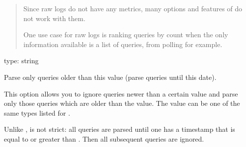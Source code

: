 \documentclass[letterpaper,10pt,english]{sphinxmanual}
\begin{document}
\begin{fulllineitems}
\begin{quote}
\sphinxAtStartPar
Since raw logs do not have any metrics, many options and features of
 do not work with them.

\sphinxAtStartPar
One use case for raw logs is ranking queries by count when the only
information available is a list of queries, from polling 
for example.
\end{quote}

\end{fulllineitems}


\begin{fulllineitems}
\label{\detokenize{mariadb-query-digest:cmdoption-mariadb-query-digest-until}}
\sphinxAtStartPar
type: string

\sphinxAtStartPar
Parse only queries older than this value (parse queries until this date).

\sphinxAtStartPar
This option allows you to ignore queries newer than a certain value and parse
only those queries which are older than the value.  The value can be one of
the same types listed for {\hyperref[\detokenize{mariadb-query-digest:cmdoption-mariadb-query-digest-since}]{}}.

\sphinxAtStartPar
Unlike {\hyperref[\detokenize{mariadb-query-digest:cmdoption-mariadb-query-digest-since}]{}}, {\hyperref[\detokenize{mariadb-query-digest:cmdoption-mariadb-query-digest-until}]{}} is not strict: all queries are parsed until
one has a timestamp that is equal to or greater than {\hyperref[\detokenize{mariadb-query-digest:cmdoption-mariadb-query-digest-until}]{}}.  Then
all subsequent queries are ignored.

\end{fulllineitems}
\end{document}
